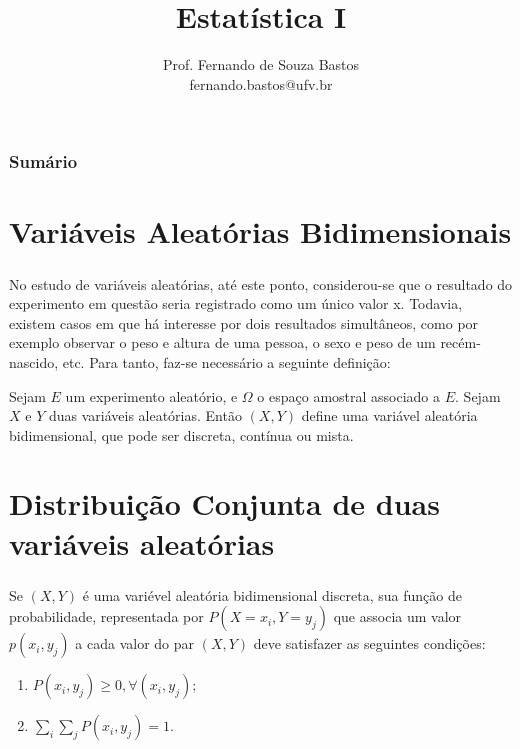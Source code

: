 \documentclass[14pt,aspectratio=1610]{beamer}
\title{Estatística I}
\author{Prof. Fernando de Souza Bastos \texorpdfstring{\\ fernando.bastos@ufv.br}{}}
\institute{Departamento de Estatística \texorpdfstring{\\ Universidade Federal de Viçosa}{}\texorpdfstring{\\ Campus UFV - Viçosa}{}}
\date{}
\begin{document}
%

\frame{\titlepage}

\begin{frame}{}
\frametitle{\bf Sumário}
\tableofcontents
\end{frame}

\section{Variáveis Aleatórias Bidimensionais}
\begin{frame}{}
\frametitle{}
\begin{block}{}
\justifying
No estudo de variáveis aleatórias, até este ponto, considerou-se que o resultado do experimento em questão seria registrado como um único valor x. Todavia, existem casos em que há interesse por dois resultados simultâneos, como por exemplo observar o peso e altura de uma pessoa, o sexo e peso de um recém-nascido, etc. Para tanto, faz-se necessário a seguinte definição:

Sejam $E$ um experimento aleatório, e $\Omega$ o espaço amostral associado a $E$.
Sejam $X$ e $Y$ duas variáveis aleatórias. Então $(X, Y )$ define uma variável aleatória bidimensional, que pode ser discreta, contínua ou mista.
\end{block}
\end{frame}

\section{Distribuição Conjunta de duas variáveis aleatórias}
\begin{frame}{}
\frametitle{}
\begin{block}{}
\justifying
Se $(X, Y )$ é uma variével aleatória bidimensional discreta, sua função de
probabilidade, representada por $P(X = x_{i}, Y = y_{j})$ que associa um valor $p(x_{i}, y_{j})$ a cada
valor do par $(X, Y )$ deve satisfazer as seguintes condições:

\begin{enumerate}
\item $P(x_{i}, y_{j})\geq 0, \forall (x_{i}, y_{j});$
\item $\displaystyle \sum_{i} \sum_{j} P(x_{i}, y_{j}) = 1.$
\end{enumerate}
\end{block}
\end{frame}
\end{document}
